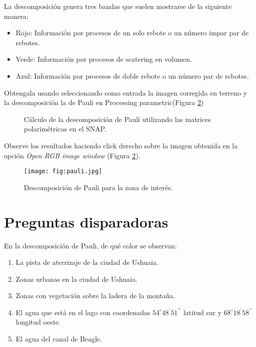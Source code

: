 La descomposición genera tres bandas que suelen mostrarse de la siguiente manera:

\begin{itemize}
    \item Rojo: Información por procesos de un solo rebote o un número impar par de rebotes.
    \item Verde: Información por procesos de scatering en volumen.
    \item Azul: Información por procesos de doble rebote o un número par de rebotes.
\end{itemize}

Obtengala usando  seleccionando como entrada la imagen corregida en terreno y la descomposición la de Pauli en Processing parametric(Figura \ref{fig:pauli})

\begin{figure}[h!]
    \centering
    \hspace{1cm}
    \caption{Cálculo de la descomposición de Pauli utilizando las matrices polarimétricas en el SNAP.}
    \label{fig:pauli}
\end{figure}

Observe los resultados haciendo click derecho sobre la imagen obtenida en la opción \emph{Open RGB image window} (Figura \ref{fig:pauli}).

\begin{figure}[h!]
    \centering
    \texttt{[image: fig:pauli.jpg]}
    \caption{Descomposición de Pauli para la zona de interés.}
    \label{fig:pauli}
\end{figure}

\section{Preguntas disparadoras}

\begin{que}
    En la descomposición de Pauli, de qué color  se observan:
    \begin{enumerate}
        \item La pista de aterrizaje de la ciudad de Ushuaia.
        \item Zonas urbanas en la ciudad de Ushuaia.
        \item Zonas con vegetación sobre la ladera de la montaña.
        \item El agua que está en el lago con coordenadas $54^\circ 48^\prime 51^{\prime\prime}$ latitud sur y $68^\circ 18^\prime 58^{\prime\prime}$ longitud oeste.
        \item El agua del canal de Beagle.
    \end{enumerate}
\end{que}
